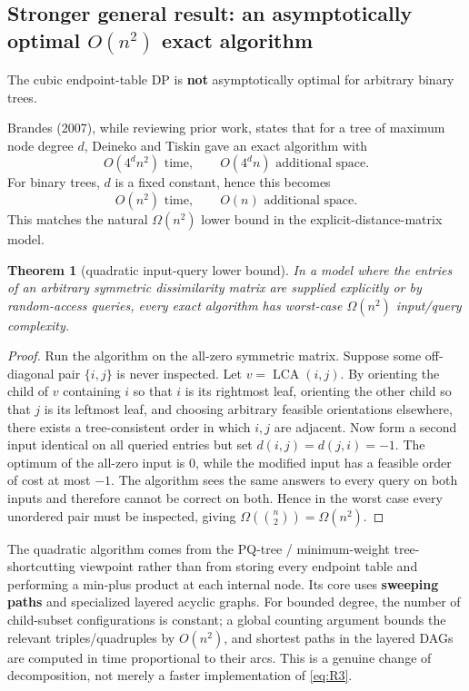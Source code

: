\documentclass[11pt]{article}
\theoremstyle{plain}
\newtheorem{theorem}{Theorem}[section]
\newcommand{\LCA}{\operatorname{LCA}}
\begin{document}
\subsection{Stronger general result: an asymptotically optimal \(O(n^2)\)
exact algorithm}
\label{sec:algo}

The cubic endpoint-table DP is \textbf{not} asymptotically optimal for
arbitrary binary trees.

Brandes (2007), while reviewing prior work, states that for a tree of maximum
node degree \(d\), Deineko and Tiskin gave an exact algorithm with
\[
O(4^d n^2) \text{ time}, \qquad O(4^d n) \text{ additional space}.
\]
For binary trees, \(d\) is a fixed constant, hence this becomes
\[
O(n^2) \text{ time}, \qquad O(n) \text{ additional space}.
\]
This matches the natural \(\Omega(n^2)\) lower bound in the
explicit-distance-matrix model.

\begin{theorem}[quadratic input-query lower bound]\label{thm:quadlb}
In a model where the entries of an arbitrary symmetric dissimilarity matrix are
supplied explicitly or by random-access queries, every exact algorithm has
worst-case \(\Omega(n^2)\) input/query complexity.
\end{theorem}

\begin{proof}
Run the algorithm on the all-zero symmetric matrix. Suppose some off-diagonal
pair \(\{i,j\}\) is never inspected. Let \(v=\LCA(i,j)\). By orienting the child
of \(v\) containing \(i\) so that \(i\) is its rightmost leaf, orienting the
other child so that \(j\) is its leftmost leaf, and choosing arbitrary feasible
orientations elsewhere, there exists a tree-consistent order in which \(i,j\)
are adjacent. Now form a second input identical on all queried entries but set
\(d(i,j)=d(j,i)=-1\). The optimum of the all-zero input is \(0\), while the
modified input has a feasible order of cost at most \(-1\). The algorithm sees
the same answers to every query on both inputs and therefore cannot be correct
on both. Hence in the worst case every unordered pair must be inspected, giving
\(\Omega(\binom{n}{2})=\Omega(n^2)\).
\end{proof}

The quadratic algorithm comes from the PQ-tree / minimum-weight tree-
shortcutting viewpoint rather than from storing every endpoint table and
performing a min-plus product at each internal node. Its core uses
\textbf{sweeping paths} and specialized layered acyclic graphs. For bounded
degree, the number of child-subset configurations is constant; a global counting
argument bounds the relevant triples/quadruples by \(O(n^2)\), and shortest
paths in the layered DAGs are computed in time proportional to their arcs. This
is a genuine change of decomposition, not merely a faster implementation of
\eqref{eq:R3}.
\end{document}
